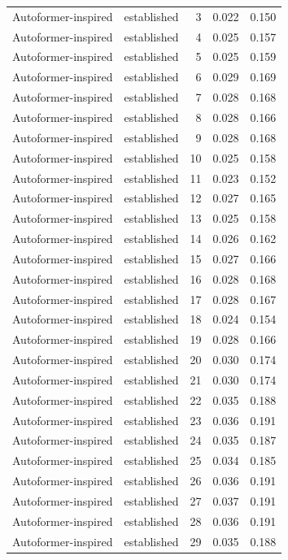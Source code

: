 \begin{tabular}{llrrr}
Autoformer-inspired & established & 3 & 0.022 & 0.150 \\
Autoformer-inspired & established & 4 & 0.025 & 0.157 \\
Autoformer-inspired & established & 5 & 0.025 & 0.159 \\
Autoformer-inspired & established & 6 & 0.029 & 0.169 \\
Autoformer-inspired & established & 7 & 0.028 & 0.168 \\
Autoformer-inspired & established & 8 & 0.028 & 0.166 \\
Autoformer-inspired & established & 9 & 0.028 & 0.168 \\
Autoformer-inspired & established & 10 & 0.025 & 0.158 \\
Autoformer-inspired & established & 11 & 0.023 & 0.152 \\
Autoformer-inspired & established & 12 & 0.027 & 0.165 \\
Autoformer-inspired & established & 13 & 0.025 & 0.158 \\
Autoformer-inspired & established & 14 & 0.026 & 0.162 \\
Autoformer-inspired & established & 15 & 0.027 & 0.166 \\
Autoformer-inspired & established & 16 & 0.028 & 0.168 \\
Autoformer-inspired & established & 17 & 0.028 & 0.167 \\
Autoformer-inspired & established & 18 & 0.024 & 0.154 \\
Autoformer-inspired & established & 19 & 0.028 & 0.166 \\
Autoformer-inspired & established & 20 & 0.030 & 0.174 \\
Autoformer-inspired & established & 21 & 0.030 & 0.174 \\
Autoformer-inspired & established & 22 & 0.035 & 0.188 \\
Autoformer-inspired & established & 23 & 0.036 & 0.191 \\
Autoformer-inspired & established & 24 & 0.035 & 0.187 \\
Autoformer-inspired & established & 25 & 0.034 & 0.185 \\
Autoformer-inspired & established & 26 & 0.036 & 0.191 \\
Autoformer-inspired & established & 27 & 0.037 & 0.191 \\
Autoformer-inspired & established & 28 & 0.036 & 0.191 \\
Autoformer-inspired & established & 29 & 0.035 & 0.188 \\

\end{tabular}

